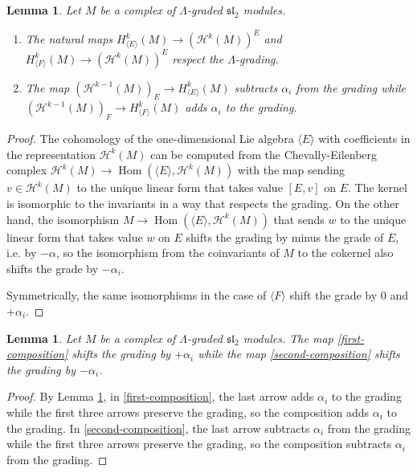 \documentclass[11pt,letterpaper]{article}
\newtheorem{lemma}[theorem]{Lemma}
\theoremstyle{definition}
\theoremstyle{remark}
\numberwithin{equation}{section}
\theoremstyle{dotless}
\newcommand{\LieH}{H}
\begin{document}
\begin{lemma}\label{simple-shift}  Let $M$ be a complex of $\Lambda$-graded $\mathfrak{sl}_2$ modules. 
\begin{enumerate}

\item The natural maps $\LieH^{k}_{\langle E \rangle} ( M) \to   ( \mathcal H^{k} (M)  )^E$ and   $ \LieH^{k}_{\langle F \rangle} ( M) \to   ( \mathcal H^{k} (M)  )^E$ respect the $\Lambda$-grading.

\item The map $( \mathcal H^{k-1} (M)  )_E \to   \LieH^{k}_{\langle E \rangle} ( M) $ subtracts $\alpha_i$ from the grading while $( \mathcal H^{k-1} (M)  )_F \to   \LieH^{k}_{\langle F \rangle} ( M) $ adds $\alpha_i$ to the grading.

\end{enumerate}

\end{lemma}

\begin{proof} The cohomology of the one-dimensional Lie algebra $\langle E \rangle$ with coefficients in the representation $\mathcal H^{k}(M)$ can be computed from the Chevally-Eilenberg complex $\mathcal H^k( M) \to  \operatorname{Hom}(\langle E\rangle, \mathcal H^{k}(M))$ with the map sending $v \in \mathcal H^k(M)$ to the unique linear form that takes value $[E,v]$ on $E$. The kernel is isomorphic to the invariants in a way that respects the grading. On the other hand, the isomorphism $M \to   \operatorname{Hom}(\langle E\rangle, \mathcal H^{k}(M))$ that sends $w$ to the unique linear form that takes value $w$ on $E$ shifts the grading by minus the grade of $E$, i.e. by $-\alpha$, so the isomorphism from the coinvariants of $M$ to the cokernel also shifts the grade by $-\alpha_i$.

Symmetrically, the same isomorphisms in the case of $\langle F\rangle$ shift the grade by $0$ and $+\alpha_i$. \end{proof}

\begin{lemma}\label{grading-shift} Let $M$ be a complex of $\Lambda$-graded $\mathfrak{sl}_2$ modules. The map \eqref{first-composition} shifts the grading by $+\alpha_i$ while the map \eqref{second-composition} shifts the grading by $-\alpha_i$. \end{lemma}

\begin{proof}  By Lemma \ref{simple-shift}, in \eqref{first-composition}, the last arrow adds $\alpha_i$ to the grading while the first three arrows preserve the grading, so the composition adds $\alpha_i$ to the grading. In \eqref{second-composition}, the last arrow subtracts $\alpha_i$ from the grading while the first three arrows preserve the grading, so the composition subtracts $\alpha_i$ from the grading. \end{proof} 
\end{document}
